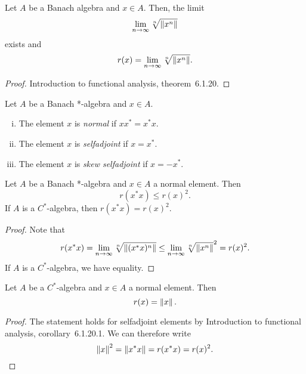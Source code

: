 \begin{izrek}
Let $A$ be a Banach algebra and $x \in A$. Then, the limit
\[
\lim_{n \to \infty} \sqrt[n]{\left\lVert x^n\right\rVert}
\]
exists and
\[
r(x) = \lim_{n \to \infty} \sqrt[n]{\left\lVert x^n\right\rVert}.
\]
\end{izrek}

\begin{proof}
Introduction to functional analysis, theorem~6.1.20.
\end{proof}

\begin{definicija}
Let $A$ be a Banach *-algebra and $x \in A$.

\begin{enumerate}[i)]
\item The element $x$ is \emph{normal} if
$x x^* = x^* x$.
\item The element $x$ is \emph{selfadjoint} if
$x = x^*$.
\item The element $x$ is
\emph{skew selfadjoint} if $x = -x^*$.
\end{enumerate}
\end{definicija}

\begin{posledica}
Let $A$ be a Banach *-algebra and $x \in A$ a normal element. Then
\[
r(x^* x) \leq r(x)^2.
\]
If $A$ is a $C^*$-algebra, then $r(x^* x) = r(x)^2$.
\end{posledica}

\begin{proof}
Note that
\[
r(x^* x) =
\lim_{n \to \infty} \sqrt[n]{\left\lVert (x^* x)^n\right\rVert} \leq
\lim_{n \to \infty} \sqrt[n]{\left\lVert x^n\right\rVert}^2 = r(x)^2.
\]
If $A$ is a $C^*$-algebra, we have equality.
\end{proof}

\begin{trditev}
Let $A$ be a $C^*$-algebra and $x \in A$ a normal element. Then
\[
r(x) = \left\lVert x\right\rVert.
\]
\end{trditev}

\begin{proof}
The statement holds for selfadjoint elements by Introduction to
functional analysis, corollary~6.1.20.1. We can therefore write
\[
\left\lVert x\right\rVert^2 = \left\lVert x^* x\right\rVert = r(x^* x) = r(x)^2. \qedhere
\]
\end{proof}
